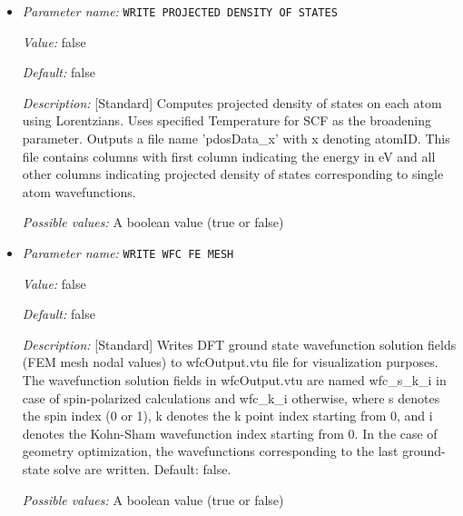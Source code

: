 \begin{itemize}
{\it Value:} false


{\it Default:} false


{\it Description:} [Standard] Computes local density of states on each atom using Lorentzians. Uses specified Temperature for SCF as the broadening parameter. Outputs a file name 'ldosData.out' containing NUMATOM+1 columns with first column indicating the energy in eV and all other NUMATOM columns indicating local density of states for each of the NUMATOM atoms.


{\it Possible values:} A boolean value (true or false)
\item {\it Parameter name:} {\tt WRITE PROJECTED DENSITY OF STATES}
\label{parameters:Post_2dprocessing Options/WRITE PROJECTED DENSITY OF STATES}
\label{parameters:Post_2dprocessing_20Options/WRITE_20PROJECTED_20DENSITY_20OF_20STATES}


{\it Value:} false


{\it Default:} false


{\it Description:} [Standard] Computes projected density of states on each atom using Lorentzians. Uses specified Temperature for SCF as the broadening parameter. Outputs a file name 'pdosData\_x' with x denoting atomID. This file contains columns with first column indicating the energy in eV and all other columns indicating projected density of states corresponding to single atom wavefunctions.


{\it Possible values:} A boolean value (true or false)
\item {\it Parameter name:} {\tt WRITE WFC FE MESH}
\label{parameters:Post_2dprocessing Options/WRITE WFC FE MESH}
\label{parameters:Post_2dprocessing_20Options/WRITE_20WFC_20FE_20MESH}


{\it Value:} false


{\it Default:} false


{\it Description:} [Standard] Writes DFT ground state wavefunction solution fields (FEM mesh nodal values) to wfcOutput.vtu file for visualization purposes. The wavefunction solution fields in wfcOutput.vtu are named wfc\_s\_k\_i in case of spin-polarized calculations and wfc\_k\_i otherwise, where s denotes the spin index (0 or 1), k denotes the k point index starting from 0, and i denotes the Kohn-Sham wavefunction index starting from 0. In the case of geometry optimization, the wavefunctions corresponding to the last ground-state solve are written.  Default: false.


{\it Possible values:} A boolean value (true or false)
\end{itemize}

